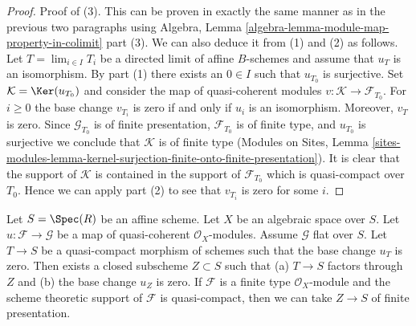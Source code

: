 \begin{proof}
\medskip\noindent
Proof of (3). This can be proven in exactly the same manner as in the
previous two paragraphs using
Algebra, Lemma \ref{algebra-lemma-module-map-property-in-colimit} part (3).
We can also deduce it from (1) and (2) as follows.
Let $T = \lim_{i \in I} T_i$ be a directed limit of affine $B$-schemes
and assume that $u_T$ is an isomorphism. By part (1) there exists
an $0 \in I$ such that $u_{T_0}$ is surjective. Set
$\mathcal{K} = \Ker(u_{T_0})$ and consider the map of quasi-coherent
modules $v : \mathcal{K} \to \mathcal{F}_{T_0}$. For $i \geq 0$ the base
change $v_{T_i}$ is zero if and only if $u_i$ is an isomorphism. Moreover,
$v_T$ is zero. Since $\mathcal{G}_{T_0}$
is of finite presentation, $\mathcal{F}_{T_0}$ is of finite type, and
$u_{T_0}$ is surjective we conclude that $\mathcal{K}$ is of finite type
(Modules on Sites, Lemma
\ref{sites-modules-lemma-kernel-surjection-finite-onto-finite-presentation}).
It is clear that the support of $\mathcal{K}$ is contained in the
support of $\mathcal{F}_{T_0}$ which is quasi-compact over $T_0$.
Hence we can apply part (2) to see that $v_{T_i}$ is zero for some $i$. 
\end{proof}

\begin{lemma}
\label{lemma-F-zero-somewhat-closed}
Let $S = \Spec(R)$ be an affine scheme. Let $X$ be an algebraic space over
$S$. Let $u : \mathcal{F} \to \mathcal{G}$ be a map of quasi-coherent
$\mathcal{O}_X$-modules. Assume $\mathcal{G}$ flat over $S$. Let $T \to S$
be a quasi-compact morphism of schemes such that the base change $u_T$ is
zero. Then exists a closed subscheme $Z \subset S$ such that
(a) $T \to S$ factors through $Z$ and (b) the base change $u_Z$ is zero.
If $\mathcal{F}$ is a finite type $\mathcal{O}_X$-module and
the scheme theoretic support of $\mathcal{F}$ is quasi-compact,
then we can take $Z \to S$ of finite presentation.
\end{lemma}

